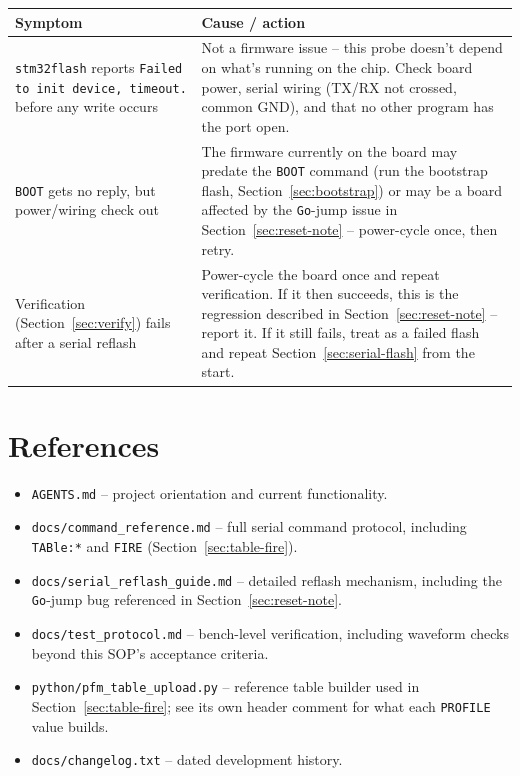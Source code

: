 \documentclass[11pt]{article}
\newcommand{\code}[1]{\texttt{#1}}
\begin{document}
\begin{center}
\begin{tabular}{p{1.7in} p{3in}}
  \hline
  \textbf{Symptom} & \textbf{Cause / action} \\
  \hline
  \code{stm32flash} reports \code{Failed to init device, timeout.}
    before any write occurs &
    Not a firmware issue -- this probe doesn't depend on what's running
    on the chip. Check board power, serial wiring (TX\slash RX not
    crossed, common GND), and that no other program has the port
    open. \\
  \code{BOOT} gets no reply, but power/wiring check out &
    The firmware currently on the board may predate the \code{BOOT}
    command (run the bootstrap flash, Section~\ref{sec:bootstrap}) or
    may be a board affected by the \code{Go}-jump issue in
    Section~\ref{sec:reset-note} -- power-cycle once, then retry. \\
  Verification (Section~\ref{sec:verify}) fails after a serial reflash &
    Power-cycle the board once and repeat verification. If it then
    succeeds, this is the regression described in
    Section~\ref{sec:reset-note} -- report it. If it still fails, treat
    as a failed flash and repeat Section~\ref{sec:serial-flash} from the
    start. \\
  \hline
\end{tabular}
\end{center}

\section{References}

\begin{itemize}
  \item \code{AGENTS.md} -- project orientation and current functionality.
  \item \code{docs/command\_reference.md} -- full serial command protocol,
    including \code{TABle:*} and \code{FIRE} (Section~\ref{sec:table-fire}).
  \item \code{docs/serial\_reflash\_guide.md} -- detailed reflash
    mechanism, including the \code{Go}-jump bug referenced in
    Section~\ref{sec:reset-note}.
  \item \code{docs/test\_protocol.md} -- bench-level verification,
    including waveform checks beyond this SOP's acceptance criteria.
  \item \code{python/pfm\_table\_upload.py} -- reference table builder
    used in Section~\ref{sec:table-fire}; see its own header comment
    for what each \code{PROFILE} value builds.
  \item \code{docs/changelog.txt} -- dated development history.
\end{itemize}
\end{document}
